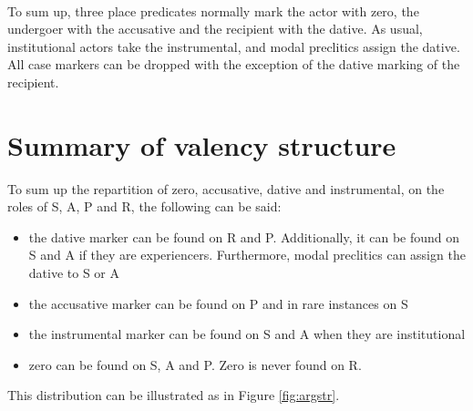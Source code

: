  \\
To sum up, three place predicates normally mark the actor with zero, the undergoer with the accusative and the recipient with the dative. As usual, institutional actors take the instrumental, and modal preclitics assign the dative. All case markers can be dropped with the exception of the dative marking of the recipient.

\section{Summary of valency structure}\label{sec:argstr:Summaryofargumentrstructure}
To sum up the repartition of zero, accusative, dative and instrumental, on the roles of S, A, P and R, the following can be said:

\begin{itemize}
 \item the dative marker can be found on R and P. Additionally, it can be found on S and A if they are experiencers. Furthermore, modal preclitics can assign the dative to S or A
 \item the accusative marker can be found on P and in rare instances on S
 \item the instrumental marker can be found on S and A when they are institutional
 \item zero can be found on S, A and P. Zero is never found on R.
\end{itemize}

This distribution can be illustrated as in Figure \ref{fig:argstr}.


